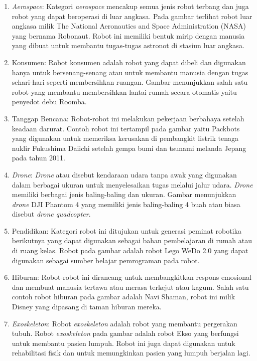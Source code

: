 \begin{enumerate}[label=(\alph*)]
    \item \textit{Aerospace}: Kategori \textit{aerospace} mencakup semua jenis robot terbang dan juga robot yang dapat beroperasi di luar angkasa. Pada gambar terlihat robot luar angkasa milik The National Aeronautics and Space Administration (NASA) yang bernama Robonaut. Robot ini memiliki bentuk mirip dengan manusia yang dibuat untuk membantu tugas-tugas astronot di stasiun luar angkasa.
    \item Konsumen: Robot konsumen adalah robot yang dapat dibeli dan digunakan hanya untuk bersenang-senang atau untuk membantu manusia dengan tugas sehari-hari seperti membersihkan ruangan. Gambar menunjukkan salah satu robot yang membantu membersihkan lantai rumah secara otomatis yaitu penyedot debu Roomba.
    \item Tanggap Bencana: Robot-robot ini melakukan pekerjaan berbahaya setelah keadaan darurat. Contoh robot ini tertampil pada gambar yaitu Packbots yang digunakan untuk memeriksa kerusakan di pembangkit listrik tenaga nuklir Fukushima Daiichi setelah gempa bumi dan tsunami melanda Jepang pada tahun 2011.
    \item \textit{Drone}: \textit{Drone} atau disebut kendaraan udara tanpa awak yang digunakan dalam berbagai ukuran untuk menyelesaikan tugas melalui jalur udara. \textit{Drone} memiliki berbagai jenis baling-baling dan ukuran. Gambar menunjukkan \textit{drone} DJI Phantom 4 yang memiliki jenis baling-baling 4 buah atau biasa disebut \textit{drone} \textit{quadcopter}. 
    \item Pendidikan: Kategori robot ini ditujukan untuk generasi peminat robotika berikutnya yang dapat digunakan sebagai bahan pembelajaran di rumah atau di ruang kelas. Robot pada gambar adalah robot Lego WeDo 2.0 yang dapat digunakan sebagai sumber belajar pemrograman pada robot.
    \item Hiburan: Robot-robot ini dirancang untuk membangkitkan respons emosional dan membuat manusia tertawa atau merasa terkejut atau kagum. Salah satu contoh robot hiburan pada gambar adalah Navi Shaman, robot ini milik Disney yang dipasang di taman hiburan mereka. 
    \item \textit{Exoskeleton}: Robot \textit{exoskeleton} adalah robot yang membantu pergerakan tubuh. Robot \textit{exoskeleton} pada gambar adalah robot Ekso yang berfungsi untuk membantu pasien lumpuh. Robot ini juga dapat digunakan untuk rehabilitasi fisik dan untuk memungkinkan pasien yang lumpuh berjalan lagi.

\end{enumerate}
